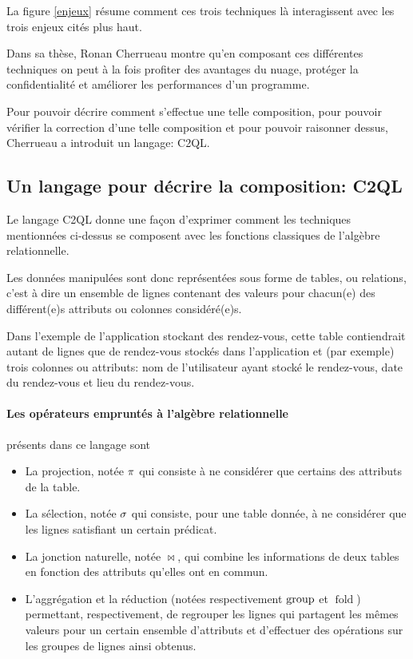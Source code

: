 La figure \ref{enjeux} résume comment ces trois techniques
là interagissent avec les trois enjeux cités plus haut.

Dans sa thèse, Ronan Cherrueau montre qu'en composant ces différentes techniques
on peut à la fois profiter des avantages du nuage, protéger la confidentialité
et améliorer les performances d'un programme.

Pour pouvoir décrire comment s'effectue une telle composition,
pour pouvoir vérifier la correction d'une telle composition et
pour pouvoir raisonner dessus, Cherrueau a introduit un langage: C2QL.

\subsection{Un langage pour décrire la composition: C2QL}
\label{descrC2QL}
Le langage C2QL donne une façon d'exprimer comment les techniques
mentionnées ci-dessus se composent avec les fonctions classiques de l'algèbre relationnelle.

Les données manipulées sont donc représentées sous forme de tables, ou relations,
c'est à dire un ensemble de lignes contenant des valeurs pour chacun(e) des 
différent(e)s attributs ou colonnes considéré(e)s.

Dans l'exemple de l'application stockant des rendez-vous, cette
table contiendrait autant de lignes que de rendez-vous stockés 
dans l'application et (par exemple) trois colonnes ou attributs: 
nom de l'utilisateur
ayant stocké le rendez-vous, date du rendez-vous et lieu du rendez-vous.

\paragraph{Les opérateurs empruntés à l'algèbre relationnelle}
présents dans ce langage sont
\begin{itemize}
	\item La projection, notée $\proj$ 
	qui consiste à ne considérer que certains des attributs de la table.
	\item La sélection, notée $\sel$
	qui consiste, pour une table donnée, à ne considérer que
	les lignes satisfiant un certain prédicat.
	\item La jonction naturelle, notée $\Join$, qui combine
	les informations de deux tables en fonction des attributs qu'elles ont
	en commun.
	\item L'aggrégation et la réduction
	(notées respectivement $\operatorname{group}$ et $\operatorname{fold}$)
	permettant, respectivement, 
	de regrouper les lignes qui partagent les mêmes valeurs
	pour un certain ensemble d'attributs
	et d'effectuer des opérations sur les groupes de lignes ainsi obtenus.
\end{itemize}


